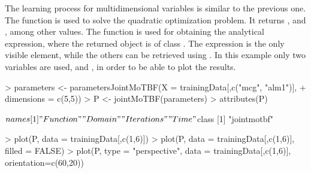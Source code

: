 The learning process for multidimensional variables is similar to the previous one.
The function  is used to solve the quadratic optimization problem. It returns
,  and , among other values. The function  is used
for obtaining the analytical expression, where the returned object is of class . The expression 
is the only visible element, while the others can be retrieved using .
In this example only two variables are used,  and , in order to be able to plot the results. 

\begin{example}
> parameters <- parametersJointMoTBF(X = trainingData[,c("mcg", "alm1")],
+                dimensions = c(5,5))
> P <- jointMoTBF(parameters)
> attributes(P)

$names
[1] "Function"   "Domain"     "Iterations" "Time"      
$class
[1] "jointmotbf"
\end{example}

\begin{example}
> plot(P, data = trainingData[,c(1,6)])
> plot(P, data = trainingData[,c(1,6)], filled = FALSE)
> plot(P, type = "perspective", data = trainingData[,c(1,6)], orientation=c(60,20))
\end{example}




